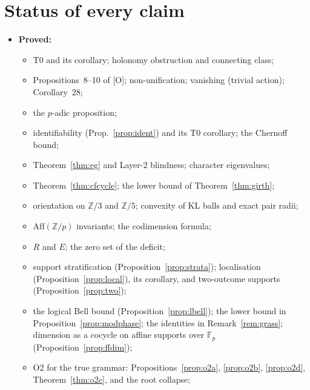\documentclass[11pt]{article}
\theoremstyle{definition}
\theoremstyle{remark}
\newcommand{\Z}{\mathbb{Z}}
\newcommand{\F}{\mathbb{F}}
\newcommand{\Aff}{\mathrm{Aff}}
\newcommand{\src}[1]{\textsf{\small[#1]}}
\begin{document}
\section{Status of every claim}
\begin{itemize}
  \item \textbf{Proved:}
  \begin{itemize}
    \item T0 and its corollary; holonomy obstruction and connecting class;
    \item Propositions~8--10 of \src{O}; non-unification; vanishing (trivial action); Corollary~28;
    \item the $p$-adic proposition;
    \item identifiability (Prop.~\ref{prop:ident}) and its T0 corollary; the Chernoff bound;
    \item Theorem~\ref{thm:eg} and Layer-2 blindness; character eigenvalues;
    \item Theorem~\ref{thm:cfcycle}; the lower bound of Theorem~\ref{thm:girth};
    \item orientation on $\Z/3$ and $\Z/5$; convexity of KL balls and exact pair radii;
    \item $\Aff(\Z/p)$ invariants; the codimension formula;
    \item $R$ and $E$; the zero set of the deficit;
    \item support stratification (Proposition~\ref{prop:strata}); localisation (Proposition~\ref{prop:local}), its corollary, and two-outcome supports (Proposition~\ref{prop:two});
    \item the logical Bell bound (Proposition~\ref{prop:lbell}); the lower bound in Proposition~\ref{prop:modphase}; the identities in Remark~\ref{rem:grass}; dimension as a cocycle on affine supports over $\F_p$ (Proposition~\ref{prop:ffdim});
    \item O2 for the true grammar: Propositions~\ref{prop:o2a}, \ref{prop:o2b}, \ref{prop:o2d}, Theorem~\ref{thm:o2c}, and the root collapse;

\end{itemize}
\end{itemize}
\end{document}
